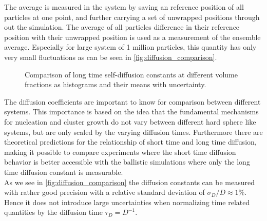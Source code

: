 The average is measured in the system by saving an reference position of all particles at one point, and further carrying a set of unwrapped positions through out the simulation. The average of all particles difference in their reference position with their unwrapped position is used as a measurement of the ensemble average. Especially for large system of 1 million particles, this quantity has only very small fluctuations as can be seen in \autoref{fig:diffusion_comparison}.


\begin{figure}[ht]
\begin{center}
 \hspace{0.5cm}
\caption[Long time self-diffusion constant measurements from production data]{Comparison of long time self-diffusion constants at different volume fractions as histograms and their means with uncertainty.}
\label{fig:diffusion_comparison}
\end{center}
\end{figure}

The diffusion coefficients are important to know for comparison between different systems. This importance is based on the idea that the fundamental mechanisms for nucleation and cluster growth do not vary between different hard sphere like systems, but are only scaled by the varying diffusion times. Furthermore there are theoretical predictions for the relationship of short time and long time diffusion, making it possible to compare experiments where the short time diffusion behavior is better accessible with the ballistic simulations where only the long time diffusion constant is measurable.\\


As we see in \autoref{fig:diffusion_comparison} the diffusion constants can be measured with rather good precision with a relative standard deviation of $\sigma_D/D \approx 1\%$. Hence it does not introduce large uncertainties when normalizing time related quantities by the diffusion time $\tau_{D} = D^{-1}$.

